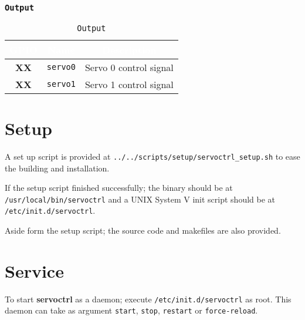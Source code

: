    \subsubsection{\texttt{Output}}
   \begin{table}[!htb]
      \begin{center}
         \begin{tabular}{|c|c|c|}
            \rowcolor{black}
            \textcolor{white}{\textbf{GPIO}}  &
            \textcolor{white}{\textbf{Name}} &
            \textcolor{white}{\textbf{Description}}\\
            \hline
            \hline
            \textbf{XX} & \texttt{servo0} & Servo 0 control signal \\
            \hline
            \textbf{XX} & \texttt{servo1} & Servo 1 control signal \\
            \hline
         \end{tabular}
         \caption{\texttt{Output}}
         \label{table:output}
      \end{center}
   \end{table}


\section{Setup}
A set up script is provided at \texttt{../../scripts/setup/servoctrl\_setup.sh}
to ease the building and installation.

If the setup script finished successfully; the binary should be at\\
\texttt{/usr/local/bin/servoctrl} and a UNIX System V init script should be at\\
\texttt{/etc/init.d/servoctrl}.

Aside form the setup script; the source code and makefiles are also provided.

\section{Service}
To start \textbf{servoctrl} as a daemon; execute \texttt{/etc/init.d/servoctrl}
as root. This daemon can take as argument \texttt{start}, \texttt{stop},
\texttt{restart} or \texttt{force-reload}.

